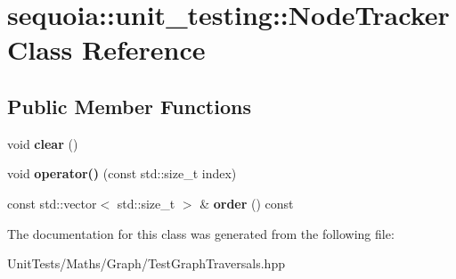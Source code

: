 \hypertarget{classsequoia_1_1unit__testing_1_1_node_tracker}{}\section{sequoia\+::unit\+\_\+testing\+::Node\+Tracker Class Reference}
\label{classsequoia_1_1unit__testing_1_1_node_tracker}
\subsection*{Public Member Functions}
\begin{DoxyCompactItemize}
\item 
\mbox{\label{classsequoia_1_1unit__testing_1_1_node_tracker_a83a55420606e062ab5b5937cf153c304}} 
void {\bfseries clear} ()
\item 
\mbox{\label{classsequoia_1_1unit__testing_1_1_node_tracker_aa4568d4f0ff11245851db422c5826422}} 
void {\bfseries operator()} (const std\+::size\+\_\+t index)
\item 
\mbox{\label{classsequoia_1_1unit__testing_1_1_node_tracker_a53c684d3b221e312a9fe81a0a3ba3075}} 
const std\+::vector$<$ std\+::size\+\_\+t $>$ \& {\bfseries order} () const
\end{DoxyCompactItemize}


The documentation for this class was generated from the following file\+:\begin{DoxyCompactItemize}
\item 
Unit\+Tests/\+Maths/\+Graph/Test\+Graph\+Traversals.\+hpp\end{DoxyCompactItemize}
